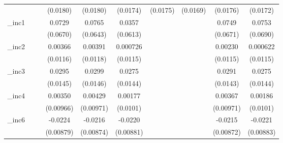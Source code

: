 \begin{table}[htbp]
\begin{tabular}{l*{9}{c}}
            &                     &                     &    (0.0180)         &    (0.0180)         &    (0.0174)         &    (0.0175)         &    (0.0169)         &    (0.0176)         &    (0.0172)         \\
[1em]
\_inc1       &                     &                     &      0.0729         &      0.0765         &      0.0357         &                     &                     &      0.0749         &      0.0753         \\
            &                     &                     &    (0.0670)         &    (0.0643)         &    (0.0613)         &                     &                     &    (0.0671)         &    (0.0690)         \\
[1em]
\_inc2       &                     &                     &     0.00366         &     0.00391         &    0.000726         &                     &                     &     0.00230         &    0.000622         \\
            &                     &                     &    (0.0116)         &    (0.0118)         &    (0.0115)         &                     &                     &    (0.0115)         &    (0.0115)         \\
[1em]
\_inc3       &                     &                     &      0.0295\sym{**} &      0.0299\sym{**} &      0.0275\sym{*}  &                     &                     &      0.0291\sym{**} &      0.0275\sym{*}  \\
            &                     &                     &    (0.0145)         &    (0.0146)         &    (0.0144)         &                     &                     &    (0.0143)         &    (0.0144)         \\
[1em]
\_inc4       &                     &                     &     0.00350         &     0.00429         &     0.00177         &                     &                     &     0.00367         &     0.00186         \\
            &                     &                     &   (0.00966)         &   (0.00971)         &    (0.0101)         &                     &                     &   (0.00971)         &    (0.0101)         \\
[1em]
\_inc6       &                     &                     &     -0.0224\sym{**} &     -0.0216\sym{**} &     -0.0220\sym{**} &                     &                     &     -0.0215\sym{**} &     -0.0221\sym{**} \\
            &                     &                     &   (0.00879)         &   (0.00874)         &   (0.00881)         &                     &                     &   (0.00872)         &   (0.00883)         \\

\end{tabular}
\end{table}
